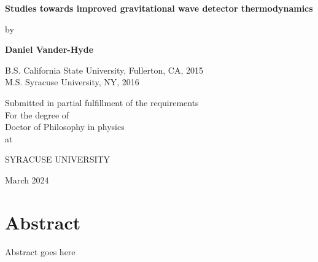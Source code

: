 \documentclass[12pt]{report}
\begin{document}
\begin{titlepage}
\begin{center}
       \vspace*{1cm}

       \textbf{\LARGE Studies towards improved gravitational wave detector thermodynamics}

       \vspace{0.5cm}
       {\large by}
            
       \vspace{0.5cm}

       \textbf{\large Daniel Vander-Hyde}


       \vspace{0.5cm}
       {\large B.S. California State University, Fullerton, CA, 2015}
       \\
       {\large M.S. Syracuse University, NY, 2016}
       
       \vspace{1.0cm}
             
       {\large Submitted in partial fulfillment of the requirements\\
       For the degree of \\
       Doctor of Philosophy in physics\\
       at}

       \vspace{0.5cm}

       {\large \uppercase{Syracuse University}}
       \vfill
     
       March 2024
            
   \end{center}
\end{titlepage}

\chapter*{Abstract}
Abstract goes here
\end{document}
